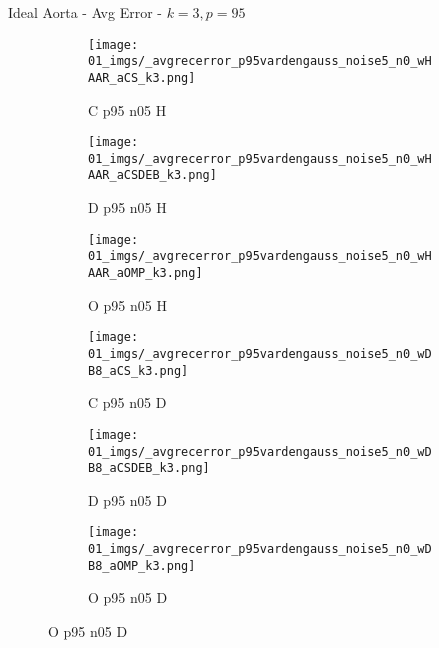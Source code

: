 \begin{frame}{Ideal Aorta - Avg Error - $k=3,p=95$}{}
\begin{figure}
\begin{subfigure}{0.13\textwidth}
\texttt{[image: 01\_imgs/\_avgrecerror\_p95vardengauss\_noise5\_n0\_wHAAR\_aCS\_k3.png]}
\caption*{\tiny C p95 n05 H}
\end{subfigure}
\begin{subfigure}{0.13\textwidth}
\texttt{[image: 01\_imgs/\_avgrecerror\_p95vardengauss\_noise5\_n0\_wHAAR\_aCSDEB\_k3.png]}
\caption*{\tiny D p95 n05 H}
\end{subfigure}
\begin{subfigure}{0.13\textwidth}
\texttt{[image: 01\_imgs/\_avgrecerror\_p95vardengauss\_noise5\_n0\_wHAAR\_aOMP\_k3.png]}
\caption*{\tiny O p95 n05 H}
\end{subfigure}
\begin{subfigure}{0.13\textwidth}
\texttt{[image: 01\_imgs/\_avgrecerror\_p95vardengauss\_noise5\_n0\_wDB8\_aCS\_k3.png]}
\caption*{\tiny C p95 n05 D}
\end{subfigure}
\begin{subfigure}{0.13\textwidth}
\texttt{[image: 01\_imgs/\_avgrecerror\_p95vardengauss\_noise5\_n0\_wDB8\_aCSDEB\_k3.png]}
\caption*{\tiny D p95 n05 D}
\end{subfigure}
\begin{subfigure}{0.13\textwidth}
\texttt{[image: 01\_imgs/\_avgrecerror\_p95vardengauss\_noise5\_n0\_wDB8\_aOMP\_k3.png]}
\caption*{\tiny O p95 n05 D}
\end{subfigure}

\vspace{5pt}


\end{figure}
\end{frame}
